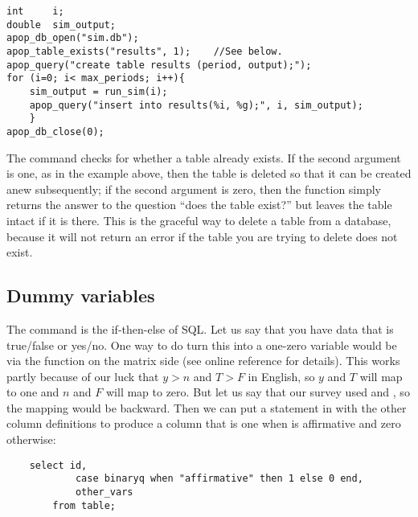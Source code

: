 \begin{lstlisting}
int     i;
double  sim_output;
apop_db_open("sim.db");
apop_table_exists("results", 1);    //See below.
apop_query("create table results (period, output);");
for (i=0; i< max_periods; i++){
    sim_output = run_sim(i);
    apop_query("insert into results(%i, %g);", i, sim_output);
    }
apop_db_close(0);
\end{lstlisting}

The  command checks for whether a table
already exists. If the second argument is one, as in the example above,
then the table is deleted so that it can be created anew subsequently;
if the second argument is zero, then the function simply returns the
answer to the question ``does the table exist?'' but leaves the table
intact if it is there. This is the graceful way to delete a table from
a database, because it will not return an error if the table you are
trying to delete does not exist.

\subsection{Dummy variables} 
The  command is the if-then-else of SQL. Let us say that you
have data that is true/false or yes/no. One way to do turn this into a
one-zero variable would be via
the  function on the matrix side
(see online reference for details). 
This works partly because of our
luck that $y > n$ and $T > F$ in English, so $y$ and $T$ will map to one
and $n$ and $F$ will map to zero. But let us say that our survey used
 and , so the mapping would be
backward.  Then we can put a  statement in with the other
column definitions to produce a column that is one when
 is affirmative and zero otherwise:
\begin{lstlisting}
    select id, 
            case binaryq when "affirmative" then 1 else 0 end, 
            other_vars
        from table;
\end{lstlisting}


